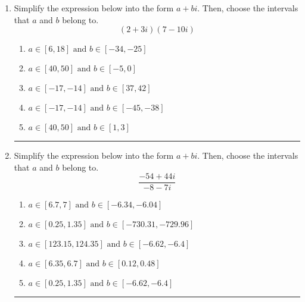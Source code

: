 \documentclass[14pt]{extbook}
\newcommand{\litem}[1]{\item#1\hspace*{-1cm}\rule{\textwidth}{0.4pt}}
\begin{document}
\begin{enumerate}
{\begin{enumerate}[label=\Alph*.]
\end{enumerate} }
\litem{
Simplify the expression below into the form $a+bi$. Then, choose the intervals that $a$ and $b$ belong to.\[ (2 + 3 i)(7 - 10 i) \]\begin{enumerate}[label=\Alph*.]
\item \( a \in [6, 18] \text{ and } b \in [-34, -25] \)
\item \( a \in [40, 50] \text{ and } b \in [-5, 0] \)
\item \( a \in [-17, -14] \text{ and } b \in [37, 42] \)
\item \( a \in [-17, -14] \text{ and } b \in [-45, -38] \)
\item \( a \in [40, 50] \text{ and } b \in [1, 3] \)

\end{enumerate} }
\litem{
Simplify the expression below into the form $a+bi$. Then, choose the intervals that $a$ and $b$ belong to.\[ \frac{-54 + 44 i}{-8 - 7 i} \]\begin{enumerate}[label=\Alph*.]
\item \( a \in [6.7, 7] \text{ and } b \in [-6.34, -6.04] \)
\item \( a \in [0.25, 1.35] \text{ and } b \in [-730.31, -729.96] \)
\item \( a \in [123.15, 124.35] \text{ and } b \in [-6.62, -6.4] \)
\item \( a \in [6.35, 6.7] \text{ and } b \in [0.12, 0.48] \)
\item \( a \in [0.25, 1.35] \text{ and } b \in [-6.62, -6.4] \)

\end{enumerate} }
\end{enumerate}
\end{document}
